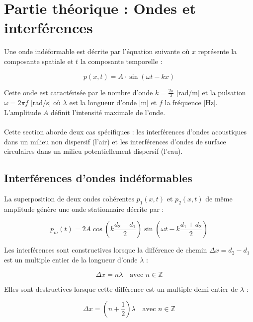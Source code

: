 \section{Partie théorique : Ondes et interférences}
\label{sec:theorie}

Une onde indéformable est décrite par l'équation suivante où \(x\) représente la composante spatiale et \(t\) la composante temporelle :

\begin{equation}
    p(x,t) = A \cdot \sin(\omega t - kx)
    \label{eq:onde}
\end{equation}

Cette onde est caractérisée par le nombre d'onde \(k = \frac{2\pi}{\lambda}\) [rad/m] et la pulsation \(\omega = 2\pi f\) [rad/s] où \(\lambda\) est la longueur d'onde [m] et \(f\) la fréquence [Hz]. L'amplitude \(A\) définit l'intensité maximale de l'onde.
\\\\
Cette section aborde deux cas spécifiques : les interférences d'ondes acoustiques dans un milieu non dispersif (l'air) et les interférences d'ondes de surface circulaires dans un milieu potentiellement dispersif (l'eau).

\subsection{Interférences d'ondes indéformables}
\label{subsec:interferences}

La superposition de deux ondes cohérentes \(p_1(x,t)\) et \(p_2(x,t)\) de même amplitude génère une onde stationnaire décrite par :

\begin{equation}
    p_m(t) = 2A \cos\left(k \frac{d_2 - d_1}{2}\right) \sin\left(\omega t - k \frac{d_1 + d_2}{2}\right)
    \label{eq:stationnaires}
\end{equation}

Les interférences sont constructives lorsque la différence de chemin \(\Delta x = d_2 - d_1\) est un multiple entier de la longueur d'onde \(\lambda\) :

\begin{equation}
    \Delta x = n \lambda \quad \text{avec } n \in \mathbb{Z}
    \label{eq:constructive}
\end{equation}

Elles sont destructives lorsque cette différence est un multiple demi-entier de \(\lambda\) :

\begin{equation}
    \Delta x = \left(n + \frac{1}{2}\right) \lambda \quad \text{avec } n \in \mathbb{Z}
    \label{eq:destructive}
\end{equation}

